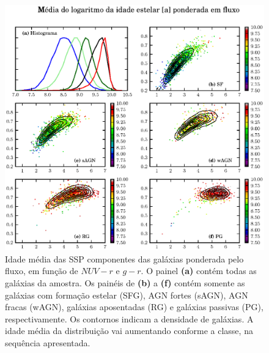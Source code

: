 \begin{figure}
	\includegraphics{figuras/uvcolor-color-at_flux-byclass.eps}
	\caption[Idade média das SSP ponderada em fluxo no diagrama cor--cor UV.]
	{Idade média das SSP componentes das galáxias ponderada pelo fluxo, em função
	de $NUV-r$ e $g-r$. O painel \textbf{(a)} contém todas as galáxias da amostra.
	Os painéis de \textbf{(b)} a \textbf{(f)} contém somente as galáxias com
	formação estelar (SFG), AGN fortes (sAGN), AGN fracas (wAGN), galáxias
	aposentadas (RG) e galáxias passivas (PG), respectivamente. Os contornos
	indicam a densidade de galáxias. A idade média da distribuição vai aumentando
	conforme a classe, na sequência apresentada.}
	\label{fig:ATFluxColor}
\end{figure}

